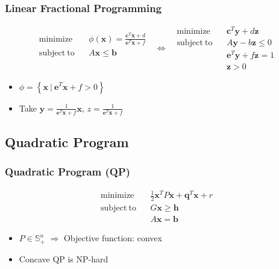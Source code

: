 \subsubsection*{Linear Fractional Programming}
\begin{equation}\begin{aligned}
    \mathrm{minimize}~~&~~\phi(\mathbf{x}) = \frac {\mathbf{c}^T\mathbf{x} + d} {\mathbf{e}^T \mathbf{x} + f} \\
    \mathrm{subject~to}~~&~~A\mathbf{x} \leq \mathbf{b} \\ {} \\ {}
\end{aligned}~~~\Leftrightarrow~~~\begin{aligned}
    \mathrm{minimize}~~&~~\mathbf{c}^T\mathbf{y} + d\mathbf{z} \\
    \mathrm{subject~to}~~&~~A\mathbf{y} - b\mathbf{z} \leq 0 \\
        &~~\mathbf{e}^T\mathbf{y} + f\mathbf{z} = 1\\
        &~~\mathbf{z} > 0
\end{aligned}\end{equation}
\begin{itemize}
    \item $\mathcal{\phi} = \left\{\mathbf{x}~|~\mathbf{e}^T\mathbf{x} + f > 0 \right\}$
    \item Take $\mathbf{y} = \frac 1 {\mathbf{e}^T\mathbf{x} + f}\mathbf{x}$, $z = \frac 1 {\mathbf{e}^T\mathbf{x} + f}$
\end{itemize}

\subsection{Quadratic Program}

\subsubsection*{Quadratic Program (QP)}
\begin{equation}\begin{aligned}
    \mathrm{minimize}~~&~~\frac 1 2 \mathbf{x}^TP\mathbf{x} + \mathbf{q}^T\mathbf{x} + r \\
    \mathrm{subject~to}~~&~~G\mathbf{x} \geq \mathbf{h} \\
        &~~A\mathbf{x} = \mathbf{b}
\end{aligned}\end{equation}
\begin{itemize}
    \item $P \in \mathbb{S}^n_+$ $\Rightarrow$ Objective function: convex
    \item Concave QP is NP-hard
\end{itemize}


